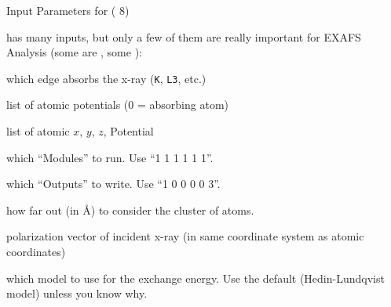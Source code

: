 \begin{slide}{Input Parameters for {  ({\feff} 8)}}

\begin{cenpage}{125mm}
  {\feff} has many  inputs, but only a few of them are really
  important for EXAFS Analysis (some are {}, some {}):

  \begin{description}[POTENTIALSXX]
  \item[{\Red{\texttt{EDGE}}}]   which edge  absorbs  the x-ray ({\tt{K}}, {\tt{L3}}, etc.)

  \item[{\Red{\texttt{POTENTIALS}}}]   list of atomic potentials (0 = absorbing atom)

  \item[{\Red{\texttt{ATOMS}}}]   list of atomic $x$, $y$, $z$, Potential

  \item[{\Red{\texttt{CONTROL}}}]   which ``Modules'' to run.  Use  ``1 1 1 1 1 1''.

  \item[{\Red{\texttt{PRINT}}}]   which ``Outputs'' to write. Use  ``1 0 0  0 0 3''.


  \item[{\Blue{\texttt{RPATH}}}]   how far out (in {\AA}) to consider the  cluster of atoms.

  \item[{\Blue{\texttt{POLARIZATION}}}]   polarization vector of incident
    x-ray (in same coordinate system as atomic coordinates)

  \item[{\Blue{\texttt{EXCHANGE}}}]   which model to use for the exchange energy.
    Use the default (Hedin-Lundqvist model) unless you know why.

  \end{description}

\end{cenpage}

\end{slide}



